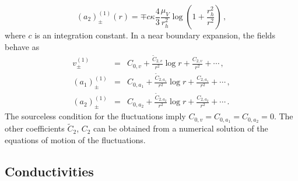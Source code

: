 \documentclass[epj]{webofc}
\begin{document}
\begin{equation}
(a_2)_\pm^{(1)}(r) = \mp c \kappa \frac{4}{3} \frac{\mu_V}{r_h^2} \log\left( 1 + \frac{r_h^2}{r^2} \right) \,, \label{eq:sola21}
\end{equation}
where $c$ is an integration constant. In a near boundary expansion, the fields behave as
\begin{eqnarray}
v_\pm^{(1)} &=& C_{0,v} + \frac{\widetilde{C}_{2,v}}{r^2}\log r + \frac{C_{2,v}}{r^2} + \cdots \,, \\
(a_1)_{\pm}^{(1)} &=& C_{0,a_1} + \frac{\widetilde{C}_{2,a_1}}{r^2}\log r + \frac{C_{2,a_1}}{r^2} + \cdots \,, \label{eq:expa1} \\
(a_2)_{\pm}^{(1)} &=& C_{0,a_2} + \frac{\widetilde{C}_{2,a_2}}{r^2}\log r + \frac{C_{2,a_2}}{r^2} + \cdots \,.
\end{eqnarray}
The sourceless condition for the fluctuations imply $C_{0,v} = C_{0,a_1} = C_{0,a_2}=0$. The other coefficients $\widetilde{C}_2$, $C_2$ can be obtained from a numerical solution of the equations of motion of the fluctuations.



\subsection{Conductivities}
\label{sec:conductivities}
\end{document}
